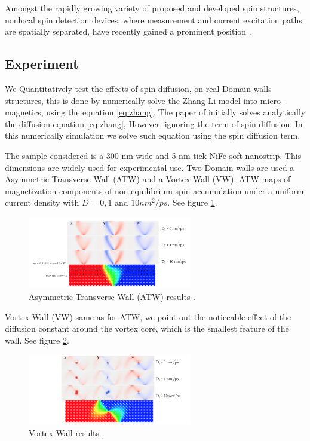Amongst the rapidly growing variety of proposed and developed spin structures, nonlocal spin detection devices, where measurement and current excitation paths are spatially separated, have recently gained a prominent position \cite{spinz}.

\subsection{Experiment}

We Quantitatively test the effects of spin diffusion, on real Domain walls structures, this is done by numerically solve the Zhang-Li model into micro-magnetics, using the equation \ref{eq:zhang}. The paper of \cite{zhang} initially solves analytically the diffusion equation \ref{eq:zhang}, However, ignoring the term of spin diffusion. In this numerically simulation we solve such equation using the spin diffusion term.

The sample considered is a 300 nm wide and 5 nm tick NiFe soft nanostrip. This dimensions are widely used for experimental use. Two Domain walls are used a Asymmetric Transverse Wall (ATW) and a Vortex Wall (VW). ATW maps of magnetization components of non equilibrium spin accumulation under a uniform current density with $D = 0, 1$ and $10 nm^2 / ps$. See figure \ref{fig:atw}.

\begin{figure}[htbp]
	\centering
		\includegraphics[width=0.64\textwidth]{Figures/ATW.png}
		\smallskip
	\caption[Asymmetric Transverse Wall results]{Asymmetric Transverse Wall (ATW) results \cite{claudio}.}
	\label{fig:atw}
\end{figure}

Vortex Wall (VW) same as for ATW, we point out the noticeable effect of the diffusion constant around the vortex core, which is the smallest feature of the wall. See figure \ref{fig:vw}.

\begin{figure}[htbp]
	\centering
		\includegraphics[width=0.64\textwidth]{Figures/VW.png}
		\smallskip
	\caption[Vortex Wall results]{Vortex Wall results \cite{claudio}. }
	\label{fig:vw}
\end{figure}

